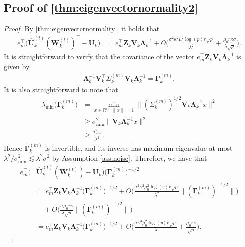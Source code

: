 \documentclass[10pt]{article}
\newcommand{\0}{{\mathbf{0}}}
\newcommand{\1}{{\mathbf{1}}}
\newcommand{\U}{{\mathbf{U}}}
\renewcommand{\t}{^{\top}}
\newcommand{\uhat}{\mathbf{\hat{U}}}
\newcommand{\inv}{^{-1}}
\renewcommand{\hat}{\widehat}
\renewcommand{\hat}{\widehat}
\begin{document}
\subsection{Proof of \cref{thm:eigenvectornormality2}} \label{sec:eigenvectornormality2proof}

\begin{proof}
 By \cref{thm:eigenvectornormality}, it holds that
\begin{align*}
    e_m\t \bigg(\uhat_k^{(t)} (\mathbf{W}_k^{(t)} )\t - \U_k\bigg) &= e_m\t \mathbf{Z}_k \mathbf{V}_k \mathbf{\Lambda}_k\inv + O\bigg( \frac{\sigma^2 \kappa^2 \mu_0^2 \log(p) r \sqrt{p}}{\lambda^2} + \frac{\mu_0 r \kappa \sigma}{\lambda \sqrt{p}}\bigg).
\end{align*}
It is straightforward to verify that the covariance of the vector $e_m\t \mathbf{Z}_k \mathbf{V}_k \mathbf{\Lambda}_k\inv$ is given by 
\begin{align*}
    \mathbf{\Lambda}_k\inv \mathbf{V}_k\t \Sigma^{(m)}_k \mathbf{V}_k \mathbf{\Lambda}_k\inv = \mathbf{\Gamma}^{(m)}_k.
\end{align*}
It is also straightforward to note that 
\begin{align*}
    \lambda_{\min} \bigg( \mathbf{\Gamma}^{(m)}_k \bigg) &= \min_{x \in \mathbb{R}^{r_k}: \|x \| = 1} \| (\Sigma^{(m)}_k)^{1/2} \mathbf{V}_k \mathbf{\Lambda}_k\inv x \|^2 \\
    &\geq \sigma_{\min}^2 \| \mathbf{V}_k \mathbf{\Lambda}_k\inv x \|^2 \\
    &\geq \frac{\sigma_{\min}^2 }{\lambda^2}.
\end{align*}
Hence $\mathbf{\Gamma}^{(m)}_k$ is invertible, and its inverse has maximum eigenvalue at most $\lambda^2/\sigma_{\min}^2 \lesssim \lambda^2 \sigma^2$ by Assumption \ref{ass:noise}.  Therefore, we have that
\begin{align*}
    e_m\t \bigg(& \uhat_k^{(t)} (\mathbf{W}_k^{(t)}) - \U_k \bigg) \big( \mathbf{\Gamma}^{(m)}_k \big)^{-1/2} \\
    &= e_m\t \mathbf{Z}_k \mathbf{V}_k \mathbf{\Lambda}_k\inv \big( \mathbf{\Gamma}^{(m)}_k \big)^{-1/2} + O\bigg( \frac{\sigma^2 \kappa^2 \mu_0^2 \log(p) r\sqrt{p}}{\lambda^2} \| (\mathbf{\Gamma}^{(m)}_k)^{-1/2} \| \bigg) \\ 
    &\quad + O\bigg(  \frac{\sigma\mu_0 r \kappa}{\lambda \sqrt{p}}  \| (\mathbf{\Gamma}^{(m)}_k)^{-1/2} \| \bigg) \\
    &= e_m\t \mathbf{Z}_k \mathbf{V}_k \mathbf{\Lambda}_k\inv \big( \mathbf{\Gamma}^{(m)}_k \big)^{-1/2} + O\bigg( \frac{\sigma \kappa^3 \mu_0^2 \log(p) r\sqrt{p}}{\lambda} + \frac{\mu_0 r \kappa}{\sqrt{p}} \bigg).

\end{align*}
\end{proof}
\end{document}
